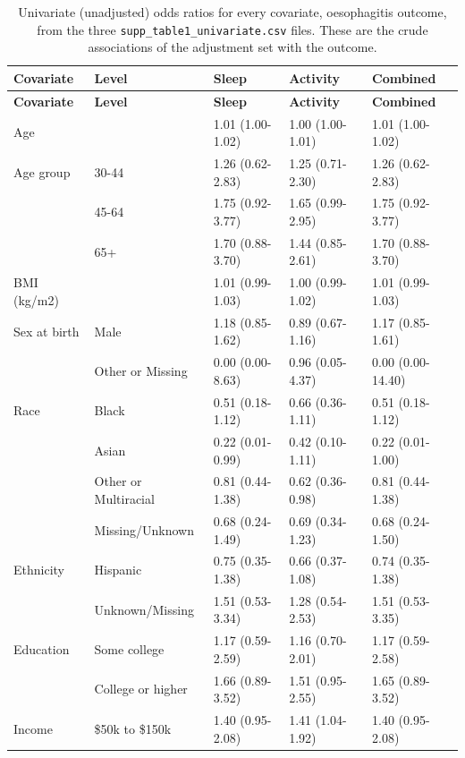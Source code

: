 \documentclass[11pt]{article}
\newcommand{\code}[1]{\texttt{\small #1}}
\begin{document}
\footnotesize\begin{longtable}{@{}p{3.4cm}p{2.6cm}p{2.3cm}p{2.3cm}p{2.3cm}@{}}
\caption{Univariate (unadjusted) odds ratios for every covariate, oesophagitis outcome, from the three \code{supp\_table1\_univariate.csv} files. These are the crude associations of the adjustment set with the outcome.}\label{tab:res-cov-eso}\\
\toprule \textbf{Covariate} & \textbf{Level} & \textbf{Sleep} & \textbf{Activity} & \textbf{Combined} \\ \midrule \endfirsthead
\toprule \textbf{Covariate} & \textbf{Level} & \textbf{Sleep} & \textbf{Activity} & \textbf{Combined} \\ \midrule \endhead
Age &  & 1.01 (1.00-1.02) & 1.00 (1.00-1.01) & 1.01 (1.00-1.02) \\
Age group & 30-44 & 1.26 (0.62-2.83) & 1.25 (0.71-2.30) & 1.26 (0.62-2.83) \\
 & 45-64 & 1.75 (0.92-3.77) & 1.65 (0.99-2.95) & 1.75 (0.92-3.77) \\
 & 65+ & 1.70 (0.88-3.70) & 1.44 (0.85-2.61) & 1.70 (0.88-3.70) \\
BMI (kg/m2) &  & 1.01 (0.99-1.03) & 1.00 (0.99-1.02) & 1.01 (0.99-1.03) \\
Sex at birth & Male & 1.18 (0.85-1.62) & 0.89 (0.67-1.16) & 1.17 (0.85-1.61) \\
 & Other or Missing & 0.00 (0.00-8.63) & 0.96 (0.05-4.37) & 0.00 (0.00-14.40) \\
Race & Black & 0.51 (0.18-1.12) & 0.66 (0.36-1.11) & 0.51 (0.18-1.12) \\
 & Asian & 0.22 (0.01-0.99) & 0.42 (0.10-1.11) & 0.22 (0.01-1.00) \\
 & Other or Multiracial & 0.81 (0.44-1.38) & 0.62 (0.36-0.98) & 0.81 (0.44-1.38) \\
 & Missing/Unknown & 0.68 (0.24-1.49) & 0.69 (0.34-1.23) & 0.68 (0.24-1.50) \\
Ethnicity & Hispanic & 0.75 (0.35-1.38) & 0.66 (0.37-1.08) & 0.74 (0.35-1.38) \\
 & Unknown/Missing & 1.51 (0.53-3.34) & 1.28 (0.54-2.53) & 1.51 (0.53-3.35) \\
Education & Some college & 1.17 (0.59-2.59) & 1.16 (0.70-2.01) & 1.17 (0.59-2.58) \\
 & College or higher & 1.66 (0.89-3.52) & 1.51 (0.95-2.55) & 1.65 (0.89-3.52) \\
Income & \$50k to \$150k & 1.40 (0.95-2.08) & 1.41 (1.04-1.92) & 1.40 (0.95-2.08) \\

\end{longtable}
\end{document}
